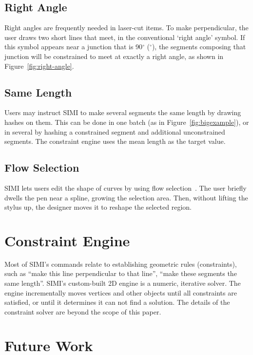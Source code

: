 \documentclass{chi-ext}
\begin{document}
\subsection{Right Angle}

Right angles are frequently needed in laser-cut items. To make
perpendicular, the user draws two short lines that meet, in the
conventional `right angle' symbol. If this symbol appears near a
junction that is 90$^{\circ}$ ($^{\circ}$), the segments
composing that junction will be constrained to meet at exactly a right
angle, as shown in Figure~\ref{fig:right-angle}.

\subsection{Same Length}

Users may instruct SIMI to make several segments the same length by
drawing hashes on them. This can be done in one batch (as in
Figure~\ref{fig:bigexample}), or in several by hashing a constrained
segment and additional unconstrained segments. The constraint engine
uses the mean length as the target value.

\subsection{Flow Selection}

SIMI lets users edit the shape of curves by using flow
selection~\cite{johnson-flow-selection}. The user briefly dwells the
pen near a spline, growing the selection area. Then, without lifting
the stylus up, the designer moves it to reshape the selected region.

\section{Constraint Engine}

Most of SIMI's commands relate to establishing geometric rules
(constraints), such as ``make this line perpendicular to that line'',
``make these segments the same length''. SIMI's custom-built 2D engine
is a numeric, iterative solver. The engine incrementally moves
vertices and other objects until all constraints are satisfied, or
until it determines it can not find a solution. The details of the
constraint solver are beyond the scope of this paper.

\section{Future Work}
\end{document}
